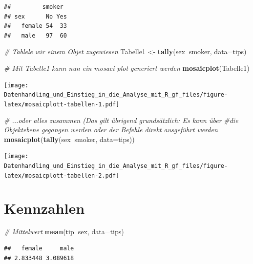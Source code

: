 \documentclass[10pt,ngerman,onside]{article}
\newenvironment{Shaded}{\begin{snugshade}}{\end{snugshade}}
\newcommand{\KeywordTok}[1]{\textcolor[rgb]{0.13,0.29,0.53}{\textbf{#1}}}
\newcommand{\DataTypeTok}[1]{\textcolor[rgb]{0.13,0.29,0.53}{#1}}
\newcommand{\StringTok}[1]{\textcolor[rgb]{0.31,0.60,0.02}{#1}}
\newcommand{\CommentTok}[1]{\textcolor[rgb]{0.56,0.35,0.01}{\textit{#1}}}
\newcommand{\OperatorTok}[1]{\textcolor[rgb]{0.81,0.36,0.00}{\textbf{#1}}}
\newcommand{\NormalTok}[1]{#1}
\begin{document}
\begin{verbatim}
##         smoker
## sex      No Yes
##   female 54  33
##   male   97  60
\end{verbatim}

\begin{Shaded}
\begin{Highlighting}[]
\CommentTok{# Tablele wir einem Objet zugewiesen}
\NormalTok{Tabelle1 <-}\StringTok{ }\KeywordTok{tally}\NormalTok{(sex}\OperatorTok{~}\NormalTok{smoker, }\DataTypeTok{data=}\NormalTok{tips)}

\CommentTok{# Mit Tabelle1 kann nun ein mosaci plot generiert werden}
\KeywordTok{mosaicplot}\NormalTok{(Tabelle1)}
\end{Highlighting}
\end{Shaded}

\texttt{[image: Datenhandling\_und\_Einstieg\_in\_die\_Analyse\_mit\_R\_gf\_files/figure-latex/mosaicplott-tabellen-1.pdf]}

\begin{Shaded}
\begin{Highlighting}[]
\CommentTok{# ...oder alles zusammen (Das gilt übrigend grundsätzlich: Es kann über }
\CommentTok{#die Objektebene gegangen werden oder der Befehle direkt ausgeführt werden}
\KeywordTok{mosaicplot}\NormalTok{(}\KeywordTok{tally}\NormalTok{(sex}\OperatorTok{~}\NormalTok{smoker, }\DataTypeTok{data=}\NormalTok{tips))}
\end{Highlighting}
\end{Shaded}

\texttt{[image: Datenhandling\_und\_Einstieg\_in\_die\_Analyse\_mit\_R\_gf\_files/figure-latex/mosaicplott-tabellen-2.pdf]}

\hypertarget{kennzahlen}{%
\section{Kennzahlen}\label{kennzahlen}}

\begin{Shaded}
\begin{Highlighting}[]
\CommentTok{# Mittelwert}
\KeywordTok{mean}\NormalTok{(tip}\OperatorTok{~}\NormalTok{sex, }\DataTypeTok{data=}\NormalTok{tips)}
\end{Highlighting}
\end{Shaded}

\begin{verbatim}
##   female     male 
## 2.833448 3.089618
\end{verbatim}
\end{document}
